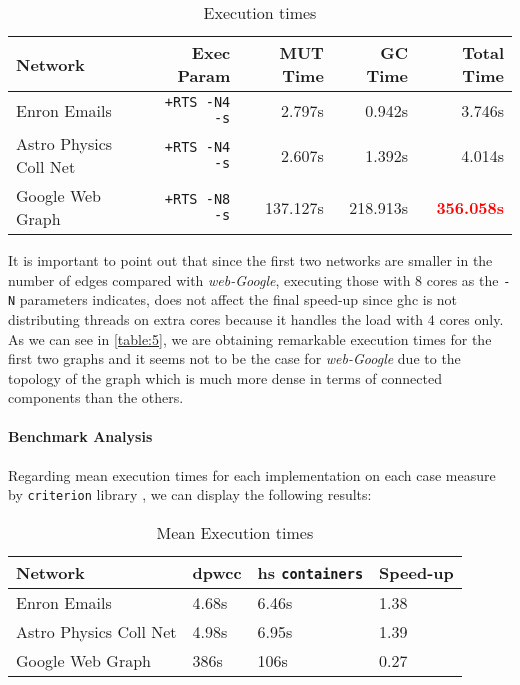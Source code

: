 \begin{table}[H]
  \centering
  \begin{tabular}{|l|r|r|r|r|}
   \hline
   \textbf{Network} & \textbf{Exec Param} & \textbf{MUT Time} & \textbf{GC Time} & \textbf{Total Time}\\
   \hline
   Enron Emails & \texttt{+RTS -N4 -s} & 2.797s & 0.942s & 3.746s \\
   \hline
   Astro Physics Coll Net & \texttt{+RTS -N4 -s} & 2.607s & 1.392s & 4.014s \\
   \hline
   Google Web Graph & \texttt{+RTS -N8 -s} & 137.127s & 218.913s & \textbf{\textcolor{red}{356.058s}} \\
   \hline
  \end{tabular}
 \caption{Execution times}
 \label{table:5}
 \end{table}

It is important to point out that since the first two networks are smaller in the number of edges compared with \emph{web-Google}, 
executing those with $8$ cores as the \texttt{-N} parameters indicates, does not affect the final speed-up since \acrshort{ghc} 
is not distributing threads on extra cores because it handles the load with $4$ cores only.
As we can see in \autoref{table:5}, we are obtaining remarkable execution times for the first two graphs and it seems not to be the case 
for \textit{web-Google} due to the topology of the graph which is much more dense in terms of connected components than the others.

\paragraph{Benchmark Analysis} Regarding mean execution times for each implementation on each case measure by \texttt{criterion} library \cite{criterion}, we can display the following results:

\begin{table}[H]
  \centering
  \begin{tabular}{|l|l|l|l|}
   \hline
   \textbf{Network} & \textbf{\acrshort{dpwcc}} & \textbf{\acrshort{hs} \texttt{containers}} & \textbf{Speed-up}\\
   \hline
   Enron Emails & 4.68s &  6.46s & 1.38\\
   \hline
   Astro Physics Coll Net & 4.98s & 6.95s  & 1.39\\
   \hline
   Google Web Graph & 386s & 106s & 0.27\\
   \hline
  \end{tabular}
 \caption{Mean Execution times}
 \label{table:6}
 \end{table}

